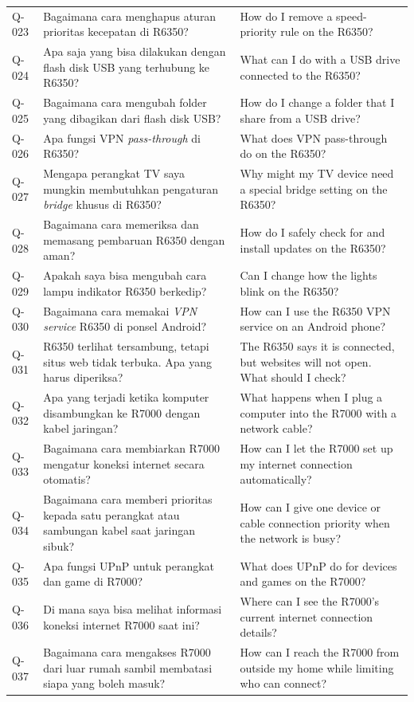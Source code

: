 \begin{longtable}{@{}>{\RaggedRight\arraybackslash}p{1.6cm}>{\RaggedRight\arraybackslash}p{5.8cm}>{\RaggedRight\arraybackslash}p{\dimexpr\textwidth-1.6cm-5.8cm-4\tabcolsep\relax}@{}}
Q-023 & Bagaimana cara menghapus aturan prioritas kecepatan di R6350? & How do I remove a speed-priority rule on the R6350? \\
Q-024 & Apa saja yang bisa dilakukan dengan flash disk USB yang terhubung ke R6350? & What can I do with a USB drive connected to the R6350? \\
Q-025 & Bagaimana cara mengubah folder yang dibagikan dari flash disk USB? & How do I change a folder that I share from a USB drive? \\
Q-026 & Apa fungsi VPN \emph{pass-through} di R6350? & What does VPN pass-through do on the R6350? \\
Q-027 & Mengapa perangkat TV saya mungkin membutuhkan pengaturan \emph{bridge} khusus di R6350? & Why might my TV device need a special bridge setting on the R6350? \\
Q-028 & Bagaimana cara memeriksa dan memasang pembaruan R6350 dengan aman? & How do I safely check for and install updates on the R6350? \\
Q-029 & Apakah saya bisa mengubah cara lampu indikator R6350 berkedip? & Can I change how the lights blink on the R6350? \\
Q-030 & Bagaimana cara memakai \emph{VPN service} R6350 di ponsel Android? & How can I use the R6350 VPN service on an Android phone? \\
Q-031 & R6350 terlihat tersambung, tetapi situs web tidak terbuka. Apa yang harus diperiksa? & The R6350 says it is connected, but websites will not open. What should I check? \\
Q-032 & Apa yang terjadi ketika komputer disambungkan ke R7000 dengan kabel jaringan? & What happens when I plug a computer into the R7000 with a network cable? \\
Q-033 & Bagaimana cara membiarkan R7000 mengatur koneksi internet secara otomatis? & How can I let the R7000 set up my internet connection automatically? \\
Q-034 & Bagaimana cara memberi prioritas kepada satu perangkat atau sambungan kabel saat jaringan sibuk? & How can I give one device or cable connection priority when the network is busy? \\
Q-035 & Apa fungsi UPnP untuk perangkat dan game di R7000? & What does UPnP do for devices and games on the R7000? \\
Q-036 & Di mana saya bisa melihat informasi koneksi internet R7000 saat ini? & Where can I see the R7000's current internet connection details? \\
Q-037 & Bagaimana cara mengakses R7000 dari luar rumah sambil membatasi siapa yang boleh masuk? & How can I reach the R7000 from outside my home while limiting who can connect? \\

\end{longtable}

